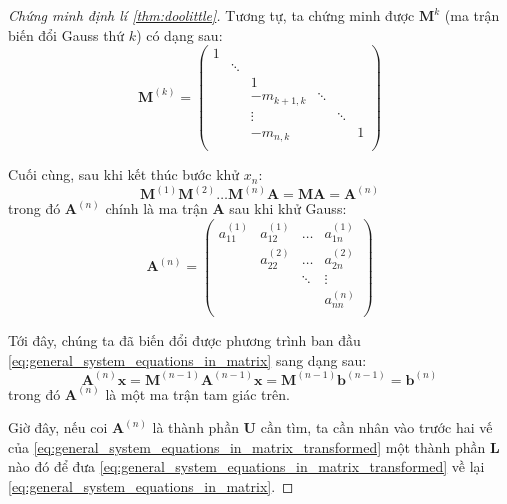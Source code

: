 \documentclass[../../Lectures]{subfiles}
\begin{document}
\begin{proof}[Chứng minh định lí \ref{thm:doolittle}]
    Tương tự, ta chứng minh được \(\bm{M}^{k}\) (ma trận biến đổi Gauss thứ
    \(k\)) có dạng sau:
    \[
        \bm{M}^{(k)} =
            \begin{pmatrix}
                1  &          &                 &          &          &     \\
                   &  \ddots  &                 &          &          &     \\
                   &          &        1        &          &          &     \\
                   &          &  -m_{k + 1, k}  &  \ddots  &          &     \\
                   &          &      \vdots     &          &  \ddots  &     \\
                   &          &  -m_{n, k}      &          &          &  1  \\
            \end{pmatrix}
    \]

    Cuối cùng, sau khi kết thúc bước khử \(x_n\):
    \[
        \bm{M}^{(1)} \bm{M}^{(2)} \ldots \bm{M}^{(n)} \bm{A} = \bm{M} \bm{A} = \bm{A}^{(n)}
    \]
    trong đó \(\bm{A}^{(n)}\) chính là ma trận \(\bm{A}\) sau khi khử Gauss:
    \[
        \bm{A}^{(n)} =
            \begin{pmatrix}
                a_{11}^{(1)}  &  a_{12}^{(1)}  &  \dots   &  a_{1n}^{(1)}  \\
                              &  a_{22}^{(2)}  &  \dots   &  a_{2n}^{(2)}  \\
                              &                &  \ddots  &     \vdots     \\
                              &                &          &  a_{nn}^{(n)}  \\
            \end{pmatrix}
    \]

    Tới đây, chúng ta đã biến đổi được phương trình ban đầu
    \eqref{eq:general_system_equations_in_matrix} sang dạng sau:
    \begin{equation}\label{eq:general_system_equations_in_matrix_transformed}
        \bm{A}^{(n)} \bm{x} = \bm{M}^{(n - 1)} \bm{A}^{(n - 1)} \bm{x} = \bm{M}^{(n - 1)} \bm{b}^{(n - 1)} = \bm{b}^{(n)}
    \end{equation}
    trong đó \(\bm{A}^{(n)}\) là một ma trận tam giác trên.

    Giờ đây, nếu coi \(\bm{A}^{(n)}\) là thành phần \(\bm{U}\) cần tìm, ta cần
    nhân vào trước hai vế của
    \eqref{eq:general_system_equations_in_matrix_transformed} một thành phần
    \(\bm{L}\) nào đó để đưa
    \eqref{eq:general_system_equations_in_matrix_transformed} về lại
    \eqref{eq:general_system_equations_in_matrix}.


\end{proof}
\end{document}
